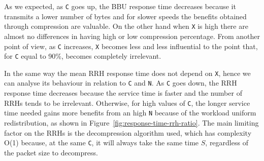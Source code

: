 \documentclass[11pt,a4paper,oneside, openright]{article}
\begin{document}
As we expected, as \texttt{C} goes up, the BBU response time decreases because it transmits a lower number of bytes and for slower speeds the benefits obtained through compression are valuable. On the other hand when \texttt{X} is high there are almost no differences in having high or low compression percentage. %
From another point of view, as \texttt{C} increases, \texttt{X} becomes less and less influential to the point that, for \texttt{C} equal to 90\%, becomes completely irrelevant.

In the same way the mean RRH response time does not depend on \texttt{X}, hence we can analyse its behaviour in relation to \texttt{C} and \texttt{N}.
As \texttt{C} goes down, the RRH response time decreases because the service time is faster and the number of RRHs tends to be irrelevant. Otherwise, for high values of \texttt{C}, the longer service time needed gains more benefits from an high \texttt{N} because of the workload uniform redistribution, as shown in Figure~\ref{fig:response-time-rrh-ratio}.
The main limiting factor on the RRHs is the decompression algorithm used, which has complexity O(1) because, at the same \texttt{C}, it will always take the same time $ S $, regardless of the packet size to decompress.
\end{document}
